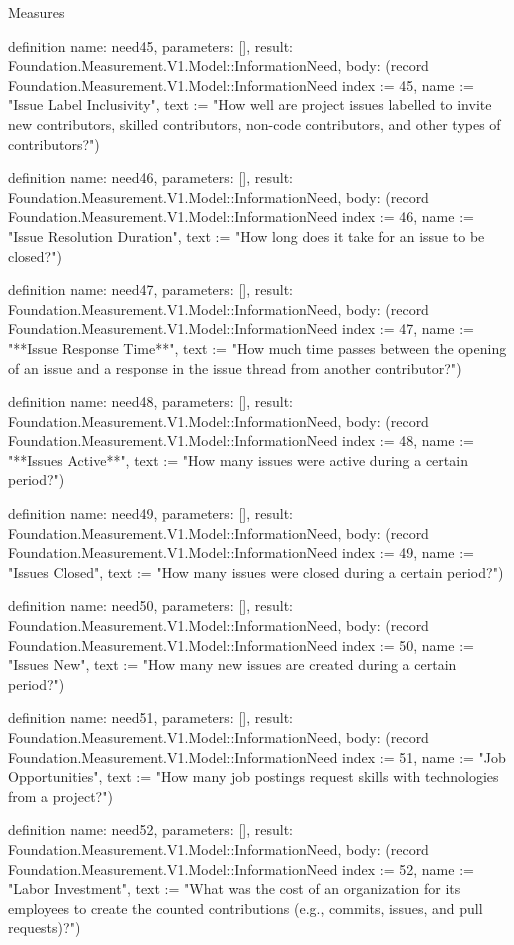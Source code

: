 \begin{lexlean}{Measures}
\begin{semanticmodule}
definition{
  name: need45,
  parameters: [],
  result: Foundation.Measurement.V1.Model::InformationNeed,
  body: (record Foundation.Measurement.V1.Model::InformationNeed {index := 45, name := "Issue Label Inclusivity", text := "How well are project issues labelled to invite new contributors, skilled contributors, non-code contributors, and other types of contributors?"})
}

definition{
  name: need46,
  parameters: [],
  result: Foundation.Measurement.V1.Model::InformationNeed,
  body: (record Foundation.Measurement.V1.Model::InformationNeed {index := 46, name := "Issue Resolution Duration", text := "How long does it take for an issue to be closed?"})
}

definition{
  name: need47,
  parameters: [],
  result: Foundation.Measurement.V1.Model::InformationNeed,
  body: (record Foundation.Measurement.V1.Model::InformationNeed {index := 47, name := "**Issue Response Time**", text := "How much time passes between the opening of an issue and a response in the issue thread from another contributor?"})
}

definition{
  name: need48,
  parameters: [],
  result: Foundation.Measurement.V1.Model::InformationNeed,
  body: (record Foundation.Measurement.V1.Model::InformationNeed {index := 48, name := "**Issues Active**", text := "How many issues were active during a certain period?"})
}

definition{
  name: need49,
  parameters: [],
  result: Foundation.Measurement.V1.Model::InformationNeed,
  body: (record Foundation.Measurement.V1.Model::InformationNeed {index := 49, name := "Issues Closed", text := "How many issues were closed during a certain period?"})
}

definition{
  name: need50,
  parameters: [],
  result: Foundation.Measurement.V1.Model::InformationNeed,
  body: (record Foundation.Measurement.V1.Model::InformationNeed {index := 50, name := "Issues New", text := "How many new issues are created during a certain period?"})
}

definition{
  name: need51,
  parameters: [],
  result: Foundation.Measurement.V1.Model::InformationNeed,
  body: (record Foundation.Measurement.V1.Model::InformationNeed {index := 51, name := "Job Opportunities", text := "How many job postings request skills with technologies from a project?"})
}

definition{
  name: need52,
  parameters: [],
  result: Foundation.Measurement.V1.Model::InformationNeed,
  body: (record Foundation.Measurement.V1.Model::InformationNeed {index := 52, name := "Labor Investment", text := "What was the cost of an organization for its employees to create the counted contributions (e.g., commits, issues, and pull requests)?"})
}


\end{semanticmodule}
\end{lexlean}

